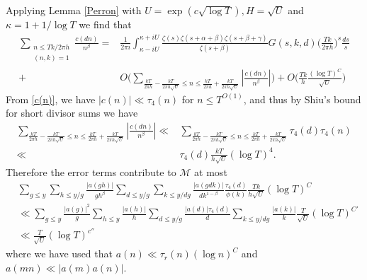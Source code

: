 \documentclass[oneside, 12pt]{amsart}
\theoremstyle{definition}
\newcommand{\leqs}{\leqslant }
\newcommand{\be}{\begin{equation*}}
\newcommand{\ee}{\end{equation*} }
\begin{document}
Applying Lemma \ref{Perron} with $U=\exp (c\sqrt{\log T}), H=\sqrt{U}$ and $\kappa=1+1/\log T$ we find that 
\be
\begin{split}
	\sum_{\substack{n\leqs Tk/2\pi h\\(n,k)=1}}\frac{c(dn)}{n^\beta}
	= &  \frac{1}{2\pi i}\int_{\kappa-iU}^{\kappa+iU}
	\frac{\zeta(s)\zeta(s+\alpha+\beta)\zeta(s+\beta+\gamma)}{\zeta(s+\beta)}G(s,k,d)
	\bigg(\frac{Tk}{2\pi h}\bigg)^s\frac{ds}{s} \\
	+ & O\bigg(\sum_{ \frac{kT}{2\pi h}-\frac{kT}{2\pi h\sqrt{U}} \leq n \leq \frac{kT}{2\pi h}+ \frac{kT}{2\pi h \sqrt{U}}}\left|\frac{c(dn)}{n^\beta}\right|\bigg)   
	+    O\bigg(\frac{Tk}{h}\frac{(\log T)^C}{\sqrt{U}}\bigg)
\end{split}
\ee
From \eqref{c(n)}, we have $|c(n)|\ll \tau_4(n)$ for $n\leqs T^{O(1)}$, and thus by Shiu's bound for short divisor sums \cite[Theorem 2]{S} we have
\begin{align*}
\sum_{ \frac{kT}{2\pi h}-\frac{kT}{2\pi h\sqrt{U}} \leq n \leq \frac{kT}{2\pi h}+ \frac{kT}{2\pi h \sqrt{U}}}\left|\frac{c(dn)}{n^\beta}\right| 
\ll &
 \sum_{ \frac{kT}{2\pi h}-\frac{kT}{2\pi h\sqrt{U}} \leq n \leq \frac{kT}{2\pi h}+ \frac{kT}{2\pi h \sqrt{U}}} \tau_4(d)\tau_4(n)
\\
\ll & \tau_4(d)\frac{kT}{h\sqrt{U}}(\log T)^4.
\end{align*}
Therefore the error terms contribute to $\mathcal{M}$ at most 
\begin{align*}
&\sum_{g\leq y}\sum_{h\leq y/g}\frac{|a(gh)|}{gh^\beta}\sum_{d\leq y/g}\sum_{k\leq y/dg}\frac{|a(gdk)|}{dk^{1-\beta}}\frac{\tau_4(d)}{\phi(k)} \frac{Tk}{h\sqrt{U}}(\log T)^C\\
& \ll  \sum_{g\leq y}\frac{|a(g)|^2}{g}\sum_{h\leq y}\frac{|a(h)|}{h} \sum_{d\leq y/g}\frac{|a(d)|\tau_4(d)}{d}\sum_{k\leq y/dg}\frac{|a(k)|}{k}\frac{T}{\sqrt{U}}(\log T)^{C'}\\
& \ll \frac{T}{\sqrt{U}}(\log T)^{c''}
\end{align*}
where we have used that $a(n)\ll \tau_r(n)(\log n)^C$ and $a(mn)\ll |a(m)a(n)|$.
\end{document}
